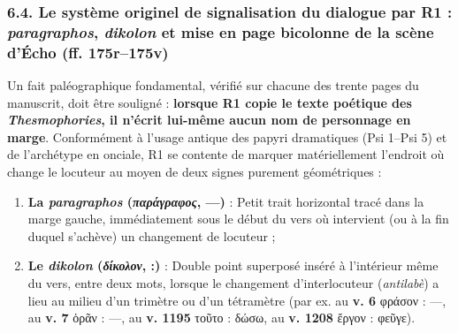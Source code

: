 \documentclass[11pt, a4paper, twoside]{article}
\renewcommand{\_}{\origunderscore\penalty0\relax}
\renewcommand{\texttt}[1]{#1}
\newcommand{\Run}{\textbf{R}\textsuperscript{1}}
\newcommand{\PsiUn}{\textgreek{Ψ}\textsuperscript{1}}
\newcommand{\PsiCinq}{\textgreek{Ψ}\textsuperscript{5}}
\def\Run{R1}%
\def\PsiUn{Psi 1}%
\def\PsiCinq{Psi 5}%
\begin{document}
\subsubsection{6.4. Le système originel de signalisation du dialogue par \Run{} : \textit{paragraphos}, \textit{dikolon} et mise en page bicolonne de la scène d'Écho (\texttt{ff. 175r–175v})}

Un fait paléographique fondamental, vérifié sur chacune des trente pages du manuscrit, doit être souligné : \textbf{lorsque \Run{} copie le texte poétique des \textit{Thesmophories}, il n'écrit lui-même aucun nom de personnage en marge}. Conformément à l'usage antique des papyri dramatiques (\PsiUn{}–\PsiCinq{}) et de l'archétype en onciale, \Run{} se contente de marquer matériellement l'endroit où change le locuteur au moyen de deux signes purement géométriques :
\begin{enumerate}[leftmargin=1.6em, itemsep=2pt]
  \item \textbf{La \textit{paragraphos} (\textit{παράγραφος}, \texttt{—})} : Petit trait horizontal tracé dans la marge gauche, immédiatement sous le début du vers où intervient (ou à la fin duquel s'achève) un changement de locuteur ;
  \item \textbf{Le \textit{dikolon} (\textit{δίκολον}, \texttt{:})} : Double point superposé inséré à l'intérieur même du vers, entre deux mots, lorsque le changement d'interlocuteur (\textit{antilabè}) a lieu au milieu d'un trimètre ou d'un tétramètre (par ex. au \textbf{v. 6} \texttt{φράσον : —}, au \textbf{v. 7} \texttt{ὁρᾶν : —}, au \textbf{v. 1195} \texttt{τοῦτο : δώσω}, au \textbf{v. 1208} \texttt{ἔργον : φεῦγε}).
\end{enumerate}
\end{document}
